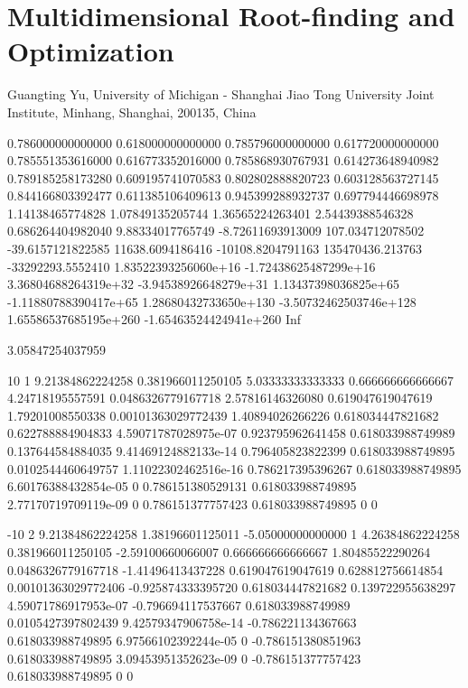 \chapter{Multidimensional Root-finding and Optimization}
\begin{center}
Guangting Yu, University of Michigan - Shanghai Jiao Tong University Joint Institute, Minhang, Shanghai, 200135, China
\end{center}


0.786000000000000			0.618000000000000
0.785796000000000			0.617720000000000
0.785551353616000			0.616773352016000
0.785868930767931			0.614273648940982
0.789185258173280			0.609195741070583
0.802802888820723			0.603128563727145
0.844166803392477			0.611385106409613
0.945399288932737			0.697794446698978
1.14138465774828			1.07849135205744
1.36565224263401			2.54439388546328
0.686264404982040			9.88334017765749
-8.72611693913009			107.034712078502
-39.6157121822585			11638.6094186416
-10108.8204791163			135470436.213763
-33292293.5552410			1.83522393256060e+16
-1.72438625487299e+16		3.36804688264319e+32
-3.94538926648279e+31		1.13437398036825e+65
-1.11880788390417e+65		1.28680432733650e+130
-3.50732462503746e+128		1.65586537685195e+260
-1.65463524424941e+260		Inf


3.05847254037959




10					1					9.21384862224258		0.381966011250105
5.03333333333333	0.666666666666667	4.24718195557591		0.0486326779167718
2.57816146326080	0.619047619047619	1.79201008550338		0.00101363029772439
1.40894026266226	0.618034447821682	0.622788884904833		4.59071787028975e-07
0.923795962641458	0.618033988749989	0.137644584884035		9.41469124882133e-14
0.796405823822399	0.618033988749895	0.0102544460649757		1.11022302462516e-16
0.786217395396267	0.618033988749895	6.60176388432854e-05	0
0.786151380529131	0.618033988749895	2.77170719709119e-09	0
0.786151377757423	0.618033988749895	0						0

-10					2					9.21384862224258		1.38196601125011
-5.05000000000000	1					4.26384862224258		0.381966011250105
-2.59100660066007	0.666666666666667	1.80485522290264		0.0486326779167718
-1.41496413437228	0.619047619047619	0.628812756614854		0.00101363029772406
-0.925874333395720	0.618034447821682	0.139722955638297		4.59071786917953e-07
-0.796694117537667	0.618033988749989	0.0105427397802439		9.42579347906758e-14
-0.786221134367663	0.618033988749895	6.97566102392244e-05	0
-0.786151380851963	0.618033988749895	3.09453951352623e-09	0
-0.786151377757423	0.618033988749895	0						0


